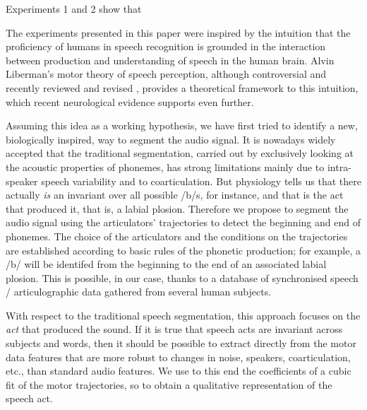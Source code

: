 Experiments
1 and 2 show that 

The experiments presented in this paper were inspired by the intuition that the
proficiency of humans in speech recognition is grounded in the interaction
between production and understanding of speech in the human brain. Alvin
Liberman's motor theory of speech perception, although controversial and
recently reviewed and revised \cite{liberman1,liberman2,galant,massaro},
provides a theoretical framework to this intuition, which recent neurological
evidence \cite{dausilio} supports even further.

Assuming this idea as a working hypothesis, we have first tried to identify
a new, biologically inspired, way to segment the audio signal.
 It is nowadays widely accepted that the traditional segmentation, carried out 
by exclusively looking at the acoustic properties of phonemes, has strong limitations
mainly due to intra-speaker speech variability and to coarticulation.  
But physiology tells us that there actually \emph{is} an invariant
over all possible /b/s, for instance, and that is the act that produced it,
that is, a labial plosion. Therefore we propose to segment the audio signal
using the articulators' trajectories to detect
the beginning and end of phonemes. The choice of the articulators and the
conditions on the trajectories are established according to basic rules of
the phonetic production; for example, a /b/ will be identifed from
the beginning to the end of an associated labial plosion. This is possible,
in our case, thanks to a database of synchronised speech / articulographic
data gathered from several human subjects.

With respect to the traditional speech segmentation, 
this approach focuses on the \emph{act} that produced the sound. If it is true that speech acts are invariant across
subjects and words, then it should be possible to extract directly from the motor data
features that are more robust to changes in noise, speakers,
coarticulation, etc., than standard
audio features. We use to this end the coefficients of a cubic fit of the
motor trajectories, so to obtain a qualitative representation of the speech
act.


